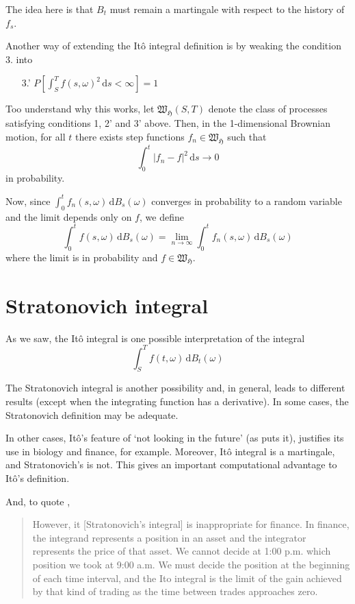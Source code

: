 The idea here is that $B_t$ must remain a martingale with respect to the history of $f_s$. 

Another way of extending the Itô integral definition is by weaking the condition 3. into
\begin{itemize}
	\item[3.'] $P \left[ \int_S^T f(s, \omega)^2 \, \mathrm{d}s < \infty \right] = 1$
\end{itemize}

Too understand why this works, let $\mathfrak{W}_{\mathfrak{H}} (S,T)$ denote the class of processes satisfying conditions 1, 2' and 3' above. Then, in the 1-dimensional Brownian motion, for all $t$ there exists step functions $f_n \in \mathfrak{W}_{\mathfrak{H}}$ such that
\[
	\int_0^t |f_n - f|^2 \, \mathrm{d}s \longrightarrow 0
\]
in probability.

Now, since $\int_0^t f_n(s, \omega) \, \mathrm{d}B_s(\omega)$ converges in probability to a random variable and the limit depends only on $f$, we define
\[
	\int_0^t f(s, \omega) \, \mathrm{d}B_s(\omega) = \lim_{n \to \infty} \int_0^t f_n(s, \omega) \, \mathrm{d}B_s(\omega)
\]
where the limit is in probability and $f \in \mathfrak{W}_{\mathfrak{H}}$.

\section{Stratonovich integral}

As we saw, the Itô integral is one possible interpretation of the integral 
\[
	\int_S^T f(t, \omega) \, \mathrm{d}B_t(\omega)
\]

The Stratonovich integral is another possibility and, in general, leads to different results (except when the integrating function has a derivative). In some cases, the Stratonovich definition may be adequate.

In other cases, Itô's feature of `not looking in the future' (as \cite{oksendal2013stochastic} puts it), justifies its use in biology and finance, for example. Moreover, Itô integral is a martingale, and Stratonovich's is not. This gives an important computational advantage to Itô's definition. 

And, to quote \cite{shreve2004stochastic},

\begin{quotation}
	However, it [Stratonovich's integral] is inappropriate for finance. In finance, the integrand represents a position in an asset and the integrator represents the price of that asset. We cannot decide at 1:00 p.m. which position we took at 9:00 a.m. We must decide the position at the beginning of each time interval, and the Ito integral is the limit of the gain achieved by that kind of trading as the time between trades approaches zero.
\end{quotation}

